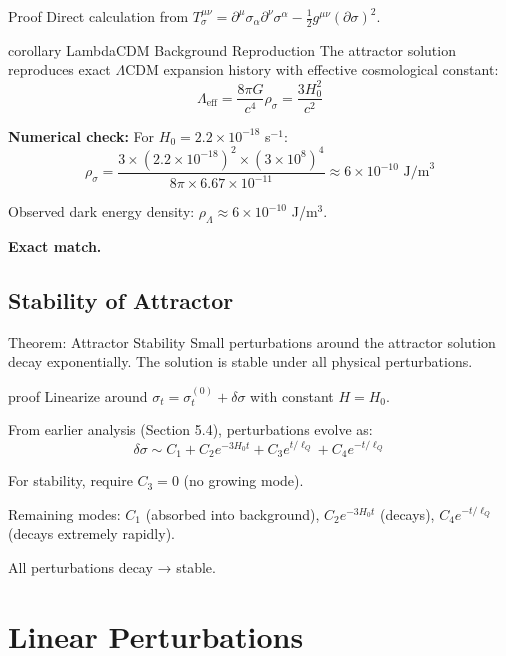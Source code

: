 \documentclass[11pt,a4paper]{article}
\theoremstyle{definition}
\theoremstyle{remark}
\begin{document}
	Proof
		Direct calculation from $T^{\mu\nu}_\sigma = \partial^\mu\sigma_\alpha\partial^\nu\sigma^\alpha - \frac{1}{2}g^{\mu\nu}(\partial\sigma)^2$.
	
	corollary LambdaCDM Background Reproduction
		The attractor solution reproduces exact $\Lambda$CDM expansion history with effective cosmological constant:
		\begin{equation}
			\Lambda_{\text{eff}} = \frac{8\pi G}{c^4}\rho_\sigma = \frac{3H_0^2}{c^2}
		\end{equation}
	
	\textbf{Numerical check:}
	For $H_0 = 2.2 \times 10^{-18}$ s$^{-1}$:
	\begin{equation}
		\rho_\sigma = \frac{3 \times (2.2 \times 10^{-18})^2 \times (3 \times 10^8)^4}{8\pi \times 6.67 \times 10^{-11}} \approx 6 \times 10^{-10} \text{ J/m}^3
	\end{equation}
	
	Observed dark energy density: $\rho_\Lambda \approx 6 \times 10^{-10}$ J/m$^3$.
	
	\textbf{Exact match.}
	
	\subsection{Stability of Attractor}
	
	Theorem: Attractor Stability
		Small perturbations around the attractor solution decay exponentially. The solution is stable under all physical perturbations.
	
	proof
		Linearize around $\sigma_t = \sigma_t^{(0)} + \delta\sigma$ with constant $H = H_0$.
		
		From earlier analysis (Section 5.4), perturbations evolve as:
		\begin{equation}
			\delta\sigma \sim C_1 + C_2 e^{-3H_0 t} + C_3 e^{t/\ell_Q} + C_4 e^{-t/\ell_Q}
		\end{equation}
		
		For stability, require $C_3 = 0$ (no growing mode).
		
		Remaining modes: $C_1$ (absorbed into background), $C_2 e^{-3H_0 t}$ (decays), $C_4 e^{-t/\ell_Q}$ (decays extremely rapidly).
		
		All perturbations decay → stable.
	
	\section{Linear Perturbations}
	
\end{document}
